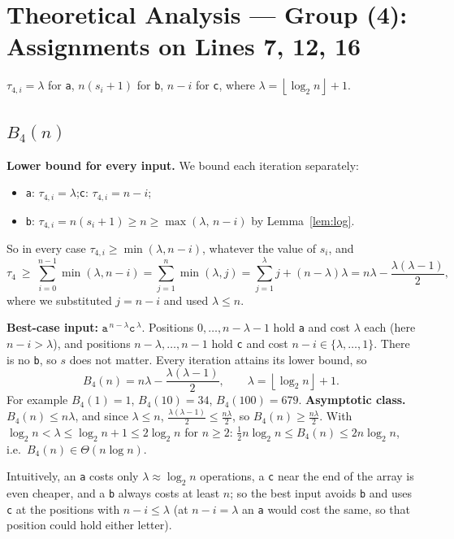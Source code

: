 \documentclass[11pt]{article}
\theoremstyle{remark}
\newcommand{\fl}[1]{\left\lfloor #1\right\rfloor}
\newcommand{\ta}{\texttt{a}}
\newcommand{\tb}{\texttt{b}}
\newcommand{\tc}{\texttt{c}}
\begin{document}
\section{Theoretical Analysis --- Group (4): Assignments on Lines 7, 12, 16}
$\tau_{4,i}=\lambda$ for \ta, $n(s_i+1)$ for \tb, $n-i$ for \tc, where $\lambda=\fl{\log_2 n}+1$.

\subsection{$B_4(n)$}
\textbf{Lower bound for every input.} We bound each iteration separately:
\begin{itemize}[nosep]
\item \ta: $\tau_{4,i}=\lambda$;\quad \tc: $\tau_{4,i}=n-i$;
\item \tb: $\tau_{4,i}=n(s_i+1)\ge n\ge\max(\lambda,\,n-i)$ by Lemma~\ref{lem:log}.
\end{itemize}
So in every case $\tau_{4,i}\ge\min(\lambda,n-i)$, whatever the value of $s_i$, and
\[
\tau_4\ \ge\ \sum_{i=0}^{n-1}\min(\lambda,n-i)=\sum_{j=1}^{n}\min(\lambda,j)=\sum_{j=1}^{\lambda}j+(n-\lambda)\lambda
=n\lambda-\frac{\lambda(\lambda-1)}{2},
\]
where we substituted $j=n-i$ and used $\lambda\le n$.

\textbf{Best-case input:} $\ta^{\,n-\lambda}\tc^{\,\lambda}$. Positions $0,\dots,n-\lambda-1$ hold \ta{} and cost
$\lambda$ each (here $n-i>\lambda$), and positions $n-\lambda,\dots,n-1$ hold \tc{} and cost $n-i\in\{\lambda,\dots,1\}$.
There is no \tb, so $s$ does not matter. Every iteration attains its lower bound, so
\[
B_4(n)=n\lambda-\frac{\lambda(\lambda-1)}{2},\qquad \lambda=\fl{\log_2 n}+1 .
\]
For example $B_4(1)=1$, $B_4(10)=34$, $B_4(100)=679$.
\textbf{Asymptotic class.} $B_4(n)\le n\lambda$, and since $\lambda\le n$, $\frac{\lambda(\lambda-1)}{2}\le\frac{n\lambda}{2}$, so
$B_4(n)\ge\frac{n\lambda}{2}$. With $\log_2 n<\lambda\le\log_2 n+1\le 2\log_2 n$ for $n\ge 2$:
$\frac12 n\log_2 n\le B_4(n)\le 2n\log_2 n$, i.e.\ $B_4(n)\in\Theta(n\log n)$.

Intuitively, an \ta{} costs only $\lambda\approx\log_2 n$ operations, a \tc{} near the end of the array is even cheaper,
and a \tb{} always costs at least $n$; so the best input avoids \tb{} and uses \tc{} at the positions with $n-i\le\lambda$ (at $n-i=\lambda$ an \ta{} would
cost the same, so that position could hold either letter).
\end{document}
